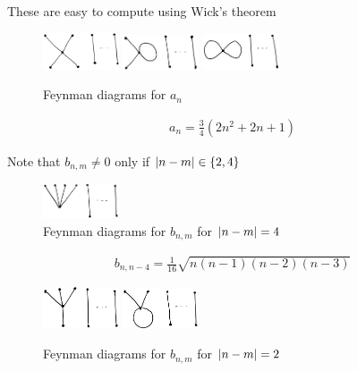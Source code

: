 \documentclass[a4paper, 12pt, fleqn]{article}
\begin{document}
  These are easy to compute using Wick's theorem
  \begin{figure}[h]
    \centering
    \includegraphics[width=0.2\textwidth]{feyn_a_n_1}
    \hspace{2cm}
    \includegraphics[width=0.2\textwidth]{feyn_a_n_2}
    \hspace{2cm}
    \includegraphics[width=0.2\textwidth]{feyn_a_n_3}
    \caption{Feynman diagrams for $a_n$}
    \label{fig:feyn_a_n}
  \end{figure}
  \begin{align}
    a_n = \frac{3}{4} \left( 2n^2 + 2n + 1 \right)
  \end{align}

  Note that $b_{n, m} \neq 0$ only if $\abs{n - m} \in \{2, 4\}$

  \begin{figure}[h]
    \centering
    \includegraphics[width=0.2\textwidth]{feyn_b_nm_1}
    \caption{Feynman diagrams for $b_{n, m}$ for $\abs{n - m} = 4$}
    \label{fig:feyn_b_nm_1}
  \end{figure}

  \begin{align}
    b_{n, n-4} = \frac{1}{16} \sqrt{n(n-1)(n-2)(n-3)}
  \end{align}

  \begin{figure}[h]
    \centering
    \includegraphics[width=0.2\textwidth]{feyn_b_nm_2}
    \hspace{2cm}
    \includegraphics[width=0.2\textwidth]{feyn_b_nm_3}
    \caption{Feynman diagrams for $b_{n, m}$ for $\abs{n - m} = 2$}
    \label{fig:feyn_b_nm_2}
  \end{figure}
\end{document}

